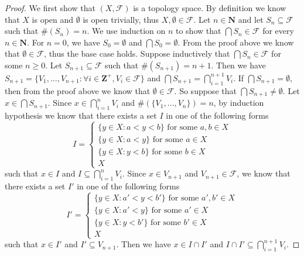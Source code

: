 \begin{proof}
    We first show that \((X, \mathcal{F})\) is a topology space.
    By definition we know that \(X\) is open and \(\emptyset\) is open trivially, thus \(X, \emptyset \in \mathcal{F}\).
    Let \(n \in \mathbf{N}\) and let \(S_n \subseteq \mathcal{F}\) such that \(\#(S_n) = n\).
    We use induction on \(n\) to show that \(\bigcap S_n \in \mathcal{F}\) for every \(n \in \mathbf{N}\).
    For \(n = 0\), we have \(S_0 = \emptyset\) and \(\bigcap S_0 = \emptyset\).
    From the proof above we know that \(\emptyset \in \mathcal{F}\), thus the base case holds.
    Suppose inductively that \(\bigcap S_n \in \mathcal{F}\) for some \(n \geq 0\).
    Let \(S_{n + 1} \subseteq \mathcal{F}\) such that \(\#(S_{n + 1}) = n + 1\).
    Then we have \(S_{n + 1} = \{V_1, \dots, V_{n + 1} : \forall i \in \mathbf{Z}^+, V_i \in \mathcal{F}\}\) and \(\bigcap S_{n + 1} = \bigcap_{i = 1}^{n + 1} V_i\).
    If \(\bigcap S_{n + 1} = \emptyset\), then from the proof above we know that \(\emptyset \in \mathcal{F}\).
    So suppose that \(\bigcap S_{n + 1} \neq \emptyset\).
    Let \(x \in \bigcap S_{n + 1}\).
    Since \(x \in \bigcap_{i = 1}^n V_i\) and \(\#(\{V_1, \dots, V_n\}) = n\), by induction hypothesis we know that there exists a set \(I\) in one of the following forms
    \[
        I = \begin{cases}
            \{y \in X : a < y < b\} \text{ for some } a, b \in X \\
            \{y \in X : a < y\} \text{ for some } a \in X        \\
            \{y \in X : y < b\} \text{ for some } b \in X        \\
            X
        \end{cases}
    \]
    such that \(x \in I\) and \(I \subseteq \bigcap_{i = 1}^n V_i\).
    Since \(x \in V_{n + 1}\) and \(V_{n + 1} \in \mathcal{F}\), we know that there exists a set \(I'\) in one of the following forms
    \[
        I' = \begin{cases}
            \{y \in X : a' < y < b'\} \text{ for some } a', b' \in X \\
            \{y \in X : a' < y\} \text{ for some } a' \in X          \\
            \{y \in X : y < b'\} \text{ for some } b' \in X          \\
            X
        \end{cases}
    \]
    such that \(x \in I'\) and \(I' \subseteq V_{n + 1}\).
    Then we have \(x \in I \cap I'\) and \(I \cap I' \subseteq \bigcap_{i = 1}^{n + 1} V_i\).

\end{proof}
